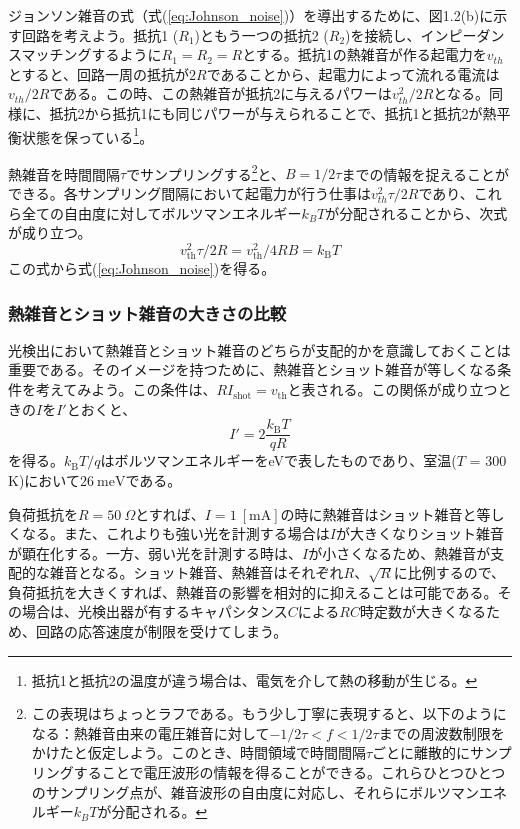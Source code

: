 ジョンソン雑音の式（式(\ref{eq:Johnson_noise})）を導出するために、図1.2(b)に示す回路を考えよう。抵抗1 ($R_1$)ともう一つの抵抗2 ($R_2$)を接続し、インピーダンスマッチングするように$R_1 = R_2 = R$とする。抵抗1の熱雑音が作る起電力を$v_{th}$とすると、回路一周の抵抗が$2R$であることから、起電力によって流れる電流は$v_{th}/2R$である。この時、この熱雑音が抵抗2に与えるパワーは$v_{th}^2/2R$となる。同様に、抵抗2から抵抗1にも同じパワーが与えられることで、抵抗1と抵抗2が熱平衡状態を保っている\footnote{抵抗1と抵抗2の温度が違う場合は、電気を介して熱の移動が生じる。}。

熱雑音を時間間隔$\tau$でサンプリングする\footnote{この表現はちょっとラフである。もう少し丁寧に表現すると、以下のようになる：熱雑音由来の電圧雑音に対して$-1/2\tau < f < 1/2\tau$までの周波数制限をかけたと仮定しよう。このとき、時間領域で時間間隔$\tau$ごとに離散的にサンプリングすることで電圧波形の情報を得ることができる。これらひとつひとつのサンプリング点が、雑音波形の自由度に対応し、それらにボルツマンエネルギー$k_B T$が分配される。}と、$B = 1/2\tau$までの情報を捉えることができる。各サンプリング間隔において起電力が行う仕事は$v^2_{th}\tau/2R$であり、これら全ての自由度に対してボルツマンエネルギー$k_BT$が分配されることから、次式が成り立つ。
\begin{equation}
v_\mathrm{th}^2\tau/2R = v_\mathrm{th}^2 / 4RB = k_\mathrm{B}T
\end{equation}
この式から式(\ref{eq:Johnson_noise})を得る。

\subsubsection{熱雑音とショット雑音の大きさの比較}
光検出において熱雑音とショット雑音のどちらが支配的かを意識しておくことは重要である。そのイメージを持つために、熱雑音とショット雑音が等しくなる条件を考えてみよう。この条件は、$RI_\mathrm{shot} = v_\mathrm{th}$と表される。この関係が成り立つときの$I$を$I'$とおくと、
\begin{equation}
	I' = 2\frac{k_\mathrm B T }{qR}
\end{equation}
を得る。$k_\mathrm{B}T/q$はボルツマンエネルギーをeVで表したものであり、室温($T$ = 300 K)において$26 \ \mathrm{meV}$である。

負荷抵抗を$R = 50 \ \Omega$とすれば、$I = 1 \ \mathrm{[mA]}$の時に熱雑音はショット雑音と等しくなる。また、これよりも強い光を計測する場合は$I$が大きくなりショット雑音が顕在化する。一方、弱い光を計測する時は、$I$が小さくなるため、熱雑音が支配的な雑音となる。ショット雑音、熱雑音はそれぞれ$R$、$\sqrt R$に比例するので、負荷抵抗を大きくすれば、熱雑音の影響を相対的に抑えることは可能である。その場合は、光検出器が有するキャパシタンス$C$による$RC$時定数が大きくなるため、回路の応答速度が制限を受けてしまう。

